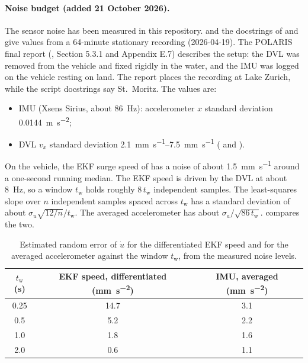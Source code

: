\paragraph{Noise budget (added 21 October 2026).}
\label{sec:noise-budget}
The sensor noise has been measured in this repository.
 and the docstrings of
 and 
give values from a 64-minute stationary recording (2026-04-19). The POLARIS final report
(, Section 5.3.1 and Appendix E.7) describes the setup:
the DVL was removed from the vehicle and fixed rigidly in the water, and the IMU was logged on the
vehicle resting on land. The report places the recording at Lake Zurich, while the script docstrings
say St.~Moritz. The values are:
\begin{itemize}
  \item IMU (Xsens Sirius, about \qty{86}{\hertz}): accelerometer $x$ standard deviation
        \qty{0.0144}{\metre\per\second\squared};
  \item DVL $v_x$ standard deviation \qtyrange{2.1}{7.5}{\milli\metre\per\second}
        ( and ).
\end{itemize}
On the vehicle, the EKF surge speed of  has a noise of about
\qty{1.5}{\milli\metre\per\second} around a one-second running median. The EKF speed is driven
by the DVL at about \qty{8}{\hertz}, so a window $t_\mathrm{w}$ holds roughly $8\,t_\mathrm{w}$
independent samples. The least-squares slope over $n$ independent samples spaced across
$t_\mathrm{w}$ has a standard deviation of about $\sigma_u\sqrt{12/n}/t_\mathrm{w}$. The averaged
accelerometer has about $\sigma_a/\sqrt{86\,t_\mathrm{w}}$.  compares the
two.

\begin{table}[htbp]
\centering
\caption{Estimated random error of $\dot u$ for the differentiated EKF speed and for the averaged
accelerometer against the window $t_\mathrm{w}$, from the measured noise levels.}
\label{tab:noise-budget}
\small
\begin{tabular}{@{}ccc@{}}
\toprule
$t_\mathrm{w}$ (\unit{\second}) & EKF speed, differentiated (\unit{\milli\metre\per\second\squared}) & IMU, averaged (\unit{\milli\metre\per\second\squared}) \\
\midrule
0.25 & 14.7 & 3.1 \\
0.5  & 5.2  & 2.2 \\
1.0  & 1.8  & 1.6 \\
2.0  & 0.6  & 1.1 \\
\bottomrule
\end{tabular}
\end{table}
\FloatBarrier

